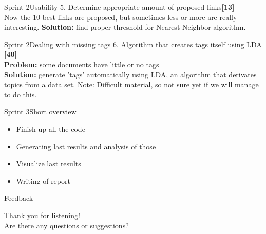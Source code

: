 \begin{frame}{Sprint 2}{Usability}
{\large 5. Determine appropriate amount of proposed links{\bf [13]}}\\
Now the 10 best links are proposed, but sometimes less or more are really interesting.\newline \newline
{\bf Solution:} find proper threshold for Nearest Neighbor algorithm. 
\end{frame}

\begin{frame}{Sprint 2}{Dealing with missing tags}
{\large 6. Algorithm that creates tags itself using LDA {\bf[40]}}\\
{\bf Problem:} some documents have little or no tags\\
{\bf Solution:} generate 'tags' automatically using LDA, an algorithm that derivates topics from a data set.\newline \newline
Note: Difficult material, so not sure yet if we will manage to do this. 
\end{frame}

\begin{frame}{Sprint 3}{Short overview}
\begin{itemize}
\item Finish up all the code
\item Generating last results and analysis of those
\item Visualize last results
\item Writing of report
\end{itemize}

\end{frame}

\begin{frame}{Feedback}

{\large Thank you for listening!}\\
Are there any questions or suggestions?
\end{frame}